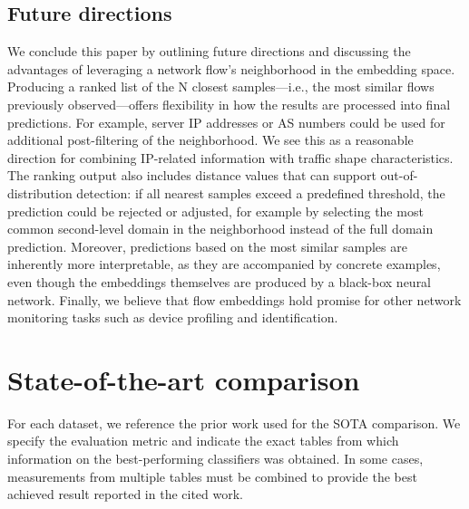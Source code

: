 \documentclass[lettersize,journal,twoside,article]{IEEEtran}
\begin{document}
\subsection{Future directions}
We conclude this paper by outlining future directions and discussing the advantages of leveraging a network flow’s neighborhood in the embedding space. Producing a ranked list of the N closest samples---i.e., the most similar flows previously observed---offers flexibility in how the results are processed into final predictions. For example, server IP addresses or AS numbers could be used for additional post-filtering of the neighborhood. We see this as a reasonable direction for combining IP-related information with traffic shape characteristics. The ranking output also includes distance values that can support out-of-distribution detection: if all nearest samples exceed a predefined threshold, the prediction could be rejected or adjusted, for example by selecting the most common second-level domain in the neighborhood instead of the full domain prediction. Moreover, predictions based on the most similar samples are inherently more interpretable, as they are accompanied by concrete examples, even though the embeddings themselves are produced by a black-box neural network. Finally, we believe that flow embeddings hold promise for other network monitoring tasks such as device profiling and identification.




\appendices

\section{State-of-the-art comparison}
\label{ap:sota-comparison}

For each dataset, we reference the prior work used for the SOTA comparison. We specify the evaluation metric and indicate the exact tables from which information on the best-performing classifiers was obtained. In some cases, measurements from multiple tables must be combined to provide the best achieved result reported in the cited work.
\end{document}
